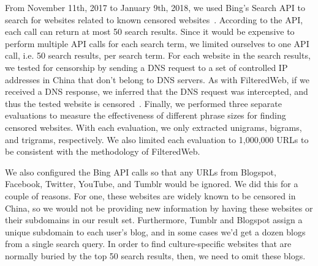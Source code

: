 From November 11th, 2017 to January 9th, 2018, we used Bing's Search
API to search for websites related to known censored
websites~\cite{microsoft:bing}. According to the API, each call can
return at most 50 search results. Since it would be expensive to
perform multiple API calls for each search term, we limited ourselves
to one API call, i.e. 50 search results, per search term. For 
each website in the search results, we tested for censorship by
sending a DNS request to a set of controlled IP addresses in China
that don't belong to DNS servers. As with FilteredWeb, if we
received a DNS response, we inferred that the DNS request was
intercepted, and thus the tested website is
censored~\cite{darer2017filteredweb}. Finally, we performed three
separate evaluations to measure the effectiveness of different phrase
sizes for finding censored websites. With each evaluation, we only
extracted unigrams, bigrams, and trigrams, respectively. We also limited
each evaluation to 1,000,000 URLs to be consistent with the
methodology of FilteredWeb.

We also configured the Bing API calls so that any URLs from Blogspot,
Facebook, Twitter, YouTube, and Tumblr would be ignored. We did this
for a couple of reasons. For one, these websites are widely known to
be censored in China, so we would not be providing new information by
having these websites or their subdomains in our result
set. Furthermore, Tumblr and Blogspot assign a unique subdomain to
each user's blog, and in some cases we'd get a dozen blogs from a
single search query. In order to find culture-specific websites that
are normally buried by the top 50 search results, then, we need to
omit these blogs.